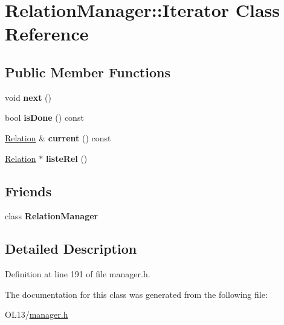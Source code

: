 \hypertarget{class_relation_manager_1_1_iterator}{}\section{Relation\+Manager\+:\+:Iterator Class Reference}
\label{class_relation_manager_1_1_iterator}
\subsection*{Public Member Functions}
\begin{DoxyCompactItemize}
\item 
\mbox{\label{class_relation_manager_1_1_iterator_a4deab2fdd2f7b70242ecbfab9d3d1552}} 
void {\bfseries next} ()
\item 
\mbox{\label{class_relation_manager_1_1_iterator_a5e9588417d8c6dc8ce1285612dff7840}} 
bool {\bfseries is\+Done} () const
\item 
\mbox{\label{class_relation_manager_1_1_iterator_ad3f5e514500480f65dc9b14d1aae358f}} 
\hyperlink{class_relation}{Relation} \& {\bfseries current} () const
\item 
\mbox{\label{class_relation_manager_1_1_iterator_a017175bf4f16360c5b2ee5d8fd534d22}} 
\hyperlink{class_relation}{Relation} $\ast$ {\bfseries liste\+Rel} ()
\end{DoxyCompactItemize}
\subsection*{Friends}
\begin{DoxyCompactItemize}
\item 
\mbox{\label{class_relation_manager_1_1_iterator_a55fae9c2e48742dd0a8596e6d8721775}} 
class {\bfseries Relation\+Manager}
\end{DoxyCompactItemize}


\subsection{Detailed Description}


Definition at line 191 of file manager.\+h.



The documentation for this class was generated from the following file\+:\begin{DoxyCompactItemize}
\item 
O\+L13/\hyperlink{manager_8h}{manager.\+h}\end{DoxyCompactItemize}
